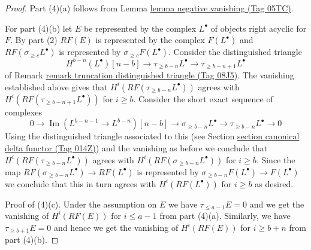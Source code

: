 \documentclass{amsart}
\theoremstyle{plain}
\theoremstyle{definition}
\theoremstyle{remark}
\numberwithin{equation}{subsection}
\def\Im{\mathop{\mathrm{Im}}}
\begin{document}
\begin{proof}
\medskip\noindent
Part (4)(a) follows from Lemma \href{https://stacks.math.columbia.edu/tag/05TC}{lemma negative vanishing (Tag 05TC)}.

\medskip\noindent
For part (4)(b) let $E$ be represented by the complex $L^\bullet$
of objects right acyclic for $F$. By part (2) $RF(E)$ is represented
by the complex $F(L^\bullet)$ and $RF(\sigma_{\geq c}L^\bullet)$
is represented by $\sigma_{\geq c}F(L^\bullet)$. Consider the
distinguished triangle
$$
H^{b - n}(L^\bullet)[n - b] \to
\tau_{\geq b - n}L^\bullet \to
\tau_{\geq b - n + 1}L^\bullet
$$
of Remark \href{https://stacks.math.columbia.edu/tag/08J5}{remark truncation distinguished triangle (Tag 08J5)}.
The vanishing established above gives that
$H^i(RF(\tau_{\geq b - n}L^\bullet))$ agrees with
$H^i(RF(\tau_{\geq b - n + 1}L^\bullet))$ for $i \geq b$.
Consider the short exact sequence of complexes
$$
0 \to
\Im(L^{b - n - 1} \to L^{b - n})[n - b] \to
\sigma_{\geq b - n}L^\bullet \to
\tau_{\geq b - n}L^\bullet \to 0
$$
Using the distinguished triangle associated to this
(see Section \href{https://stacks.math.columbia.edu/tag/014Z}{section canonical delta functor (Tag 014Z)})
and the vanishing as before we conclude that
$H^i(RF(\tau_{\geq b - n}L^\bullet))$ agrees with
$H^i(RF(\sigma_{\geq b - n}L^\bullet))$ for $i \geq b$.
Since the map $RF(\sigma_{\geq b - n}L^\bullet) \to RF(L^\bullet)$
is represented by $\sigma_{\geq b - n}F(L^\bullet) \to F(L^\bullet)$
we conclude that this in turn agrees with $H^i(RF(L^\bullet))$
for $i \geq b$ as desired.

\medskip\noindent
Proof of (4)(c). Under the assumption on $E$ we have
$\tau_{\leq a - 1}E = 0$ and we get the vanishing
of $H^i(RF(E))$ for $i \leq a - 1$ from part (4)(a).
Similarly, we have $\tau_{\geq b + 1}E = 0$ and hence
we get the vanishing of $H^i(RF(E))$ for $i \geq b + n$ from
part (4)(b).
\end{proof}
\end{document}
